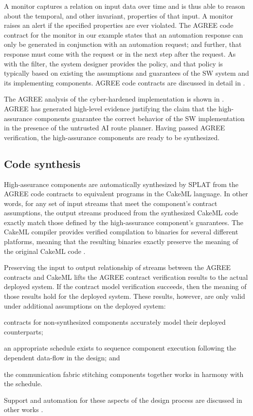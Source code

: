 A monitor captures a relation on input data over time and is thus able
to reason about the temporal, and other invariant, properties of that input.  A monitor raises
an alert if the specified properties are ever violated.  The
AGREE code contract for the monitor in our example states that an
automation response can only be generated in conjunction with an
automation request; and further, that response must come with the
request or in the next step after the request.  As with the filter,
the system designer provides the policy, and that policy is typically
based on existing the assumptions and guarantees of the SW system and its implementing components.
AGREE code contracts are discussed in detail in .

The AGREE analysis of the cyber-hardened implementation is shown in
. AGREE has generated high-level
evidence justifying the claim that the high-assurance components
guarantee the correct behavior of the SW implementation in the
presence of the untrusted AI route planner.  Having passed AGREE
verification, the high-assurance components are ready to be
synthesized.

\subsection{Code synthesis}
High-assurance components are automatically synthesized by SPLAT from
the AGREE code contracts to equivalent programs in the CakeML
language.
 In other words, for any set of input streams that meet the
 component's contract assumptions, the output streams produced from
 the synthesized CakeML code exactly match those defined by the
 high-assurance component's guarantees.  The CakeML compiler provides
 verified compilation to binaries for several different platforms,
 meaning that the resulting binaries exactly preserve the meaning of
 the original CakeML code \cite{cakeml}.

Preserving the input to output relationship of streams between the
AGREE contracts and CakeML lifts the AGREE contract verification
results to the actual deployed system.  If the contract model
verification succeeds, then the meaning of those results hold for the
deployed system.  These results, however, are only valid under
additional assumptions on the deployed system:
\begin{compactitem}
\item contracts for non-synthesized components accurately model their deployed
counterparts;
\item an appropriate schedule exists to sequence component
  execution following the dependent data-flow in the design; and
\item the communication fabric stitching components together works in harmony
  with the schedule.
\end{compactitem}
\noindent Support and automation for these aspects of the design process are
discussed in other works \cite{gearcase2020, dcrypps2019, 10.1007/978-3-030-89159-6_18, 10.1007/978-3-030-89159-6_17, sel4-2009, scheduled-agree, 9734792}.
